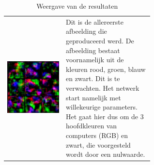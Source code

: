 \documentclass[dutch, twoside, a4paper, 10pt]{article}
\begin{document}
\newpage
\begin{table}[H]
    \centering
    \caption{Weergave van de resultaten}
    \label{Tab: weergave}
    \begin{tabular}{c p{0.6\linewidth}}
          \includegraphics[scale=0.18]{0.jpg}&  \vspace{-10\baselineskip} Dit is de allereerste afbeelding die geproduceerd werd. De afbeelding bestaat voornamelijk uit de kleuren rood, groen, blauw en zwart. Dit is te verwachten. Het netwerk start namelijk met willekeurige parameters. Het gaat hier dus om de 3 hoofdkleuren van computers (RGB) en zwart, die voorgesteld wordt door een nulwaarde.\\

\end{tabular}
\end{table}
\end{document}
